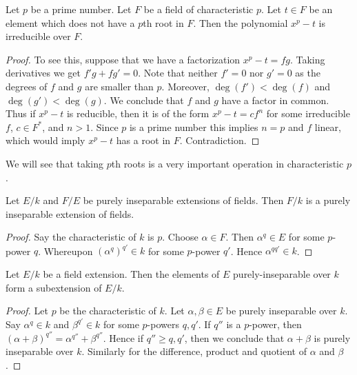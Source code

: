 \begin{lemma}
\label{lemma-take-pth-root}
Let $p$ be a prime number. Let $F$ be a field of characteristic $p$.
Let $t \in F$ be an element which does not have a $p$th root in $F$.
Then the polynomial $x^p - t$ is irreducible over $F$.
\end{lemma}

\begin{proof}
To see this, suppose that we have a factorization
$x^p - t = f g$. Taking derivatives we get $f' g + f g' = 0$.
Note that neither $f' = 0$ nor $g' = 0$ as the degrees of $f$ and $g$
are smaller than $p$. Moreover, $\deg(f') < \deg(f)$ and $\deg(g') < \deg(g)$.
We conclude that $f$ and $g$ have a factor in common. Thus if $x^p - t$
is reducible, then it is of the form $x^p - t = c f^n$ for some irreducible
$f$, $c \in F^*$, and $n > 1$. Since $p$ is a prime number this
implies $n = p$ and $f$ linear, which would imply $x^p - t$ has a root
in $F$. Contradiction.
\end{proof}

\noindent
We will see that taking $p$th roots is a very important operation in
characteristic $p$.

\begin{lemma}
\label{lemma-purely-inseparable-permanence}
Let $E/k$ and $F/E$ be purely inseparable extensions of fields. Then $F/k$
is a purely inseparable extension of fields.
\end{lemma}

\begin{proof}
Say the characteristic of $k$ is $p$. Choose $\alpha \in F$. Then
$\alpha^q \in E$ for some $p$-power $q$. Whereupon $(\alpha^q)^{q'} \in k$
for some $p$-power $q'$. Hence $\alpha^{qq'} \in k$.
\end{proof}

\begin{lemma}
\label{lemma-purely-inseparable-elements}
Let $E/k$ be a field extension. Then the elements of $E$ purely-inseparable
over $k$ form a subextension of $E/k$.
\end{lemma}

\begin{proof}
Let $p$ be the characteristic of $k$.
Let $\alpha, \beta \in E$ be purely inseparable over $k$. Say
$\alpha^q \in k$ and $\beta^{q'} \in k$ for some $p$-powers $q, q'$.
If $q''$ is a $p$-power, then
$(\alpha + \beta)^{q''} = \alpha^{q''} + \beta^{q''}$.
Hence if $q'' \geq q, q'$, then we conclude that $\alpha + \beta$
is purely inseparable over $k$. Similarly for the difference,
product and quotient of $\alpha$ and $\beta$.
\end{proof}




